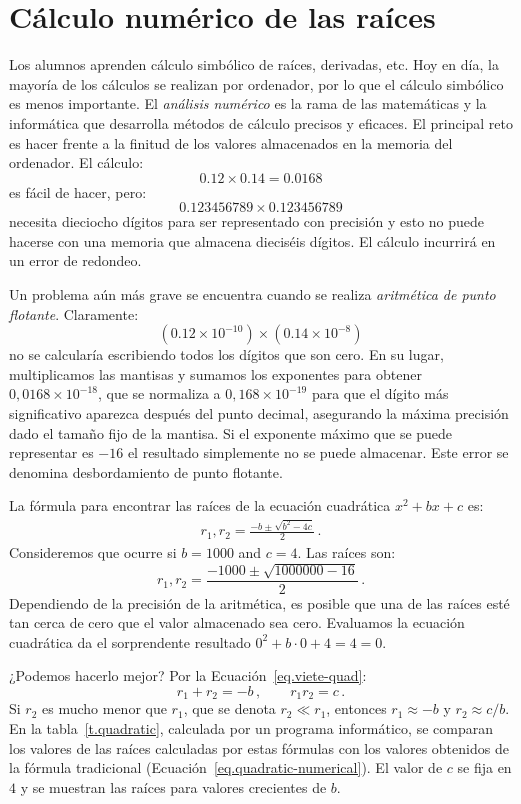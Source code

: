 \section{Cálculo numérico de las raíces}\label{s.numerical}

Los alumnos aprenden cálculo simbólico de raíces, derivadas, etc. Hoy en día, la mayoría de los cálculos se realizan por ordenador, por lo que el cálculo simbólico es menos importante. El \emph{análisis numérico} es la rama de las matemáticas y la informática que desarrolla métodos de cálculo precisos y eficaces. El principal reto es hacer frente a la finitud de los valores almacenados en la memoria del ordenador. El cálculo:
\[0.12 \times 0.14=0.0168\]
es fácil de hacer, pero:
\[
0.123456789\times 0.123456789\]
necesita dieciocho dígitos para ser representado con precisión y esto no puede hacerse con una memoria que almacena dieciséis dígitos. El cálculo incurrirá en un error de redondeo.

Un problema aún más grave se encuentra cuando se realiza \emph{aritmética de punto flotante}. Claramente:
\[(0.12\times 10^{-10})\times (0.14\times 10^{-8})\]
no se calcularía escribiendo todos los dígitos que son cero. En su lugar, multiplicamos las mantisas y sumamos los exponentes para obtener $0,0168\times 10^{-18}$, que se normaliza a $0,168\times 10^{-19}$ para que el dígito más significativo aparezca después del punto decimal, asegurando la máxima precisión dado el tamaño fijo de la mantisa. Si el exponente máximo que se puede representar es $-16$ el resultado simplemente no se puede almacenar. Este error se denomina desbordamiento de punto flotante.

La fórmula para encontrar las raíces de la ecuación cuadrática $x^2+bx+c$ es:
\begin{align}
r_1, r_2 = \frac{-b\pm\sqrt{b^2-4c}}{2}\,.\label{eq.quadratic-numerical}
\end{align}
Consideremos que ocurre si $b=1000$ and $c=4$. Las raíces son:
\[
r_1, r_2 = \frac{-1000\pm\sqrt{1000000-16}}{2}\,.
\]
Dependiendo de la precisión de la aritmética, es posible que una de las raíces esté tan cerca de cero que el valor almacenado sea cero. Evaluamos la ecuación cuadrática da el sorprendente resultado $0^2+b\cdot 0 +4= 4= 0$.

¿Podemos hacerlo mejor? Por la Ecuación~\ref{eq.viete-quad}:
\[
r_1+r_2 = -b\,,\quad\quad r_1r_2=c\,.
\]
Si $r_2$ es mucho menor que $r_1$, que se denota $r_2\ll r_1$, entonces $r_1\approx -b$ y $r_2\approx c/b$. En la tabla~\ref{t.quadratic}, calculada por un programa informático, se comparan los valores de las raíces calculadas por estas fórmulas con los valores obtenidos de la fórmula tradicional (Ecuación~\ref{eq.quadratic-numerical}). El valor de $c$ se fija en $4$ y se muestran las raíces para valores crecientes de $b$.

